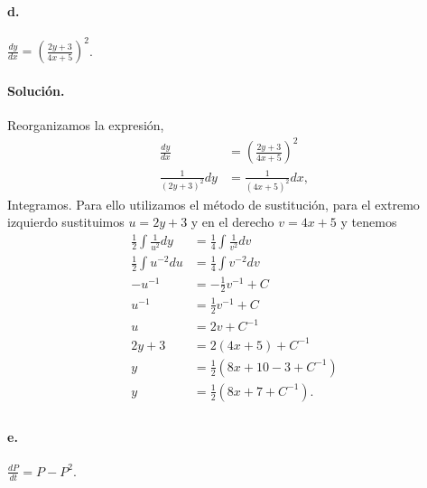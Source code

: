 \documentclass{article}
\begin{document}
\paragraph{d.} $\frac{dy}{dx} = \left(\frac{2y + 3}{4x + 5}\right)^2$.
\paragraph{Solución.} Reorganizamos la expresión,
\begin{align*}
	\frac{dy}{dx} &= \left(\frac{2y + 3}{4x + 5}\right)^2\\
	\frac{1}{(2y + 3)^2}dy &= \frac{1}{(4x + 5)^2}dx,
\end{align*}
Integramos. Para ello utilizamos el método de sustitución, para el extremo izquierdo sustituimos $u = 2y + 3$ y en el derecho $v = 4x + 5$ y tenemos
\begin{align*}
	\frac{1}{2}\int \frac{1}{u^2}dy &= \frac{1}{4} \int \frac{1}{v^2}dv\\
	\frac{1}{2}\int u^{-2}du &= \frac{1}{4} \int v^{-2} dv\\
	- u^{-1} &= -\frac{1}{2} v^{-1} + C \\
	u^{-1} &= \frac{1}{2} v^{-1} + C \\
	u &= 2v + C^{-1} \\
	2y + 3 &= 2(4x + 5) + C^{-1}\\
	y &= \frac{1}{2}(8x + 10 - 3 + C^{-1})\\
	y  &= \frac{1}{2}(8x + 7 + C^{-1}).\\
\end{align*}

\paragraph{e.} $\frac{dP}{dt} = P - P^{2}$.
\end{document}
